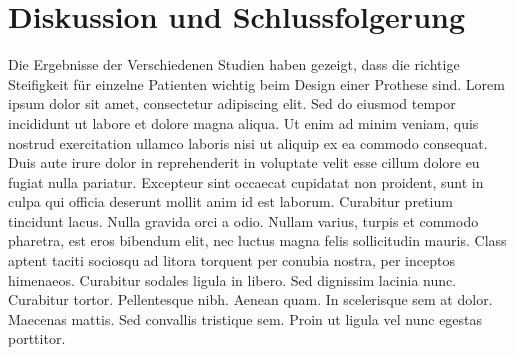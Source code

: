 \section{Diskussion und Schlussfolgerung}
Die Ergebnisse der Verschiedenen Studien haben gezeigt, dass die richtige Steifigkeit für einzelne Patienten wichtig beim Design einer Prothese sind. 
Lorem ipsum dolor sit amet, consectetur adipiscing elit. Sed do eiusmod tempor incididunt ut labore et dolore magna aliqua. Ut enim ad minim veniam, quis nostrud exercitation ullamco laboris nisi ut aliquip ex ea commodo consequat. Duis aute irure dolor in reprehenderit in voluptate velit esse cillum dolore eu fugiat nulla pariatur. Excepteur sint occaecat cupidatat non proident, sunt in culpa qui officia deserunt mollit anim id est laborum. Curabitur pretium tincidunt lacus. Nulla gravida orci a odio. Nullam varius, turpis et commodo pharetra, est eros bibendum elit, nec luctus magna felis sollicitudin mauris. Class aptent taciti sociosqu ad litora torquent per conubia nostra, per inceptos himenaeos. Curabitur sodales ligula in libero. Sed dignissim lacinia nunc. Curabitur tortor. Pellentesque nibh. Aenean quam. In scelerisque sem at dolor. Maecenas mattis. Sed convallis tristique sem. Proin ut ligula vel nunc egestas porttitor.








